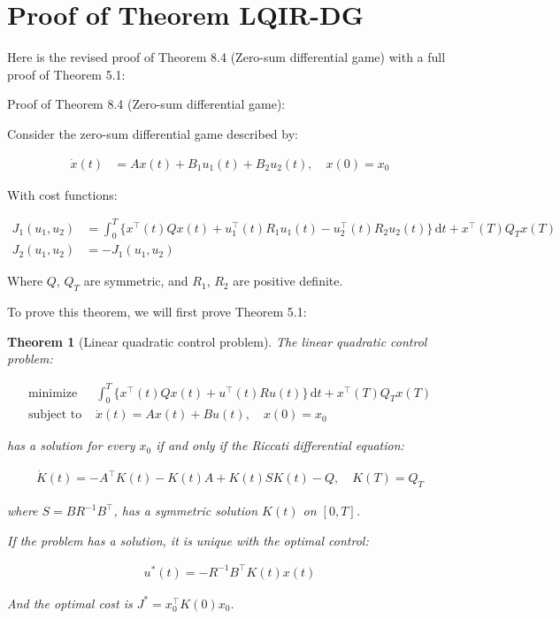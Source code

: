 \documentclass[3p]{elsarticle}
\newtheorem{theorem}{Theorem}
\begin{document}
\section{Proof of Theorem LQIR-DG}
\label{appendix:proof_LQIR-DG}
Here is the revised proof of Theorem 8.4 (Zero-sum differential game) with a full proof of Theorem 5.1:

Proof of Theorem 8.4 (Zero-sum differential game):

Consider the zero-sum differential game described by:

\begin{align*}
\dot{x}(t) &= Ax(t) + B_1u_1(t) + B_2u_2(t), \quad x(0)=x_0
\end{align*}

With cost functions:

\begin{align*}
J_1(u_1,u_2) &= \int_0^T \{x^\top (t)Qx(t) + u_1^\top(t) R_1u_1(t) - u_2^\top(t)R_2u_2(t)\}\,\mathrm{d}t + x^\top(T)Q_Tx(T) \\
J_2(u_1,u_2) &= -J_1(u_1,u_2)
\end{align*}

Where $Q$, $Q_T$ are symmetric, and $R_1$, $R_2$ are positive definite.

To prove this theorem, we will first prove Theorem 5.1:

\begin{theorem}[Linear quadratic control problem]
The linear quadratic control problem:

\begin{align*}
\text{minimize } &\int_0^T\{x^\top(t) Q x(t) + u^\top(t) R u(t)\}\,\mathrm{d}t + x^\top(T)Q_Tx(T) \\
\text{subject to } &\dot{x}(t) = Ax(t) + Bu(t), \quad x(0) = x_0  
\end{align*}

has a solution for every $x_0$ if and only if the Riccati differential equation:

\begin{align*}
\dot{K}(t) = -A^\top K(t) - K(t)A + K(t)SK(t) - Q, \quad K(T) = Q_T  
\end{align*}

where $S=BR^{-1}B^\top$, has a symmetric solution $K(t)$ on $[0,T]$. 

If the problem has a solution, it is unique with the optimal control:

\begin{align*}
u^*(t) = -R^{-1}B^\top K(t) x(t)
\end{align*}

And the optimal cost is $J^* = x_0^\top K(0) x_0$.
\end{theorem}
\end{document}
